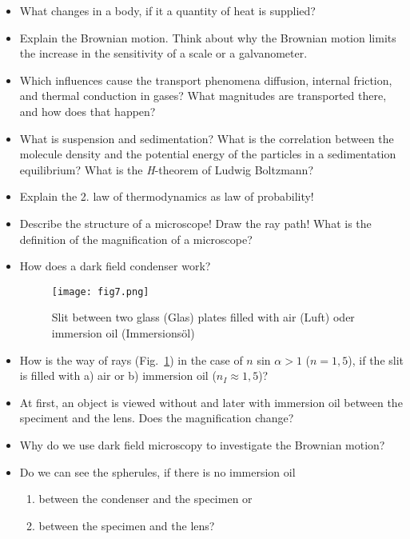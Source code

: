 \documentclass{tudphygp_eng}
\begin{document}
\begin{itemize}
\item What changes in a body, if it a quantity of heat is supplied?
 
\item Explain the Brownian motion. Think about why the Brownian motion limits the increase in the sensitivity of a scale or a galvanometer.

\item Which influences cause the transport phenomena diffusion, internal friction, and thermal conduction in gases? What magnitudes are transported there, and how does that happen?

\item What is suspension and sedimentation? What is the correlation between the molecule density and the potential energy of the particles in a sedimentation equilibrium? What is the \textit{H}-theorem of Ludwig Boltzmann?

\item Explain the 2. law of thermodynamics as law of probability!

\item Describe the structure of a microscope! Draw the ray path! What is the definition of the magnification of a microscope?

\item How does a dark field condenser work? 

\begin{figure}[h]
\begin{center}
\texttt{[image: fig7.png]} 
\caption{Slit between two glass (\grqq{}Glas\grqq{}) plates filled with air (\grqq{}Luft\grqq{}) oder immersion oil (\grqq{}Immersionsöl\grqq{})}
\label{fig7}
\end{center}
\end{figure}

\item How is the way of rays (Fig.~\ref{fig7}) in the case of $n$ sin $\alpha > 1$ ($n=1,5$), if the slit is filled with a) air or b) immersion oil ($n_I \approx 1,5$)?

\item At first, an object is viewed without and later with immersion oil between the speciment and the lens. Does the magnification change?

\item Why do we use dark field microscopy to investigate the Brownian motion?

\item Do we can see the spherules, if there is no immersion oil
\begin{enumerate}\itemsep=0pt
 \item between the condenser and the specimen or
 \item between the specimen and the lens?
\end{enumerate}


\end{itemize}
\end{document}

